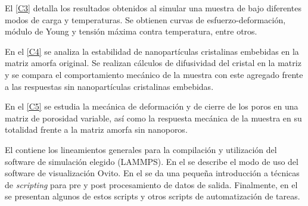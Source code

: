 El \cref{C3} detalla los resultados obtenidos al simular una muestra de \CuZr bajo diferentes modos de carga y temperaturas. Se obtienen curvas de esfuerzo-deformación, módulo de Young y tensión máxima contra temperatura, entre otros.

En el \cref{C4} se analiza la estabilidad de nanopartículas cristalinas embebidas en la matriz amorfa original. Se realizan cálculos de difusividad del cristal en la matriz y se compara el comportamiento mecánico de la muestra con este agregado frente a las respuestas sin nanopartículas cristalinas embebidas.

En el \cref{C5} se estudia la mecánica de deformación y de cierre de los poros en una matriz de porosidad variable, así como la respuesta mecánica de la muestra en su totalidad frente a la matriz amorfa sin nanoporos. 

El  contiene los lineamientos generales para la compilación y utilización del software de simulación elegido (LAMMPS). En el  se describe el modo de uso del software de visualización Ovito. En el  se da una pequeña introducción a técnicas de \textit{scripting} para pre y post procesamiento de datos de salida. Finalmente, en el  se presentan algunos de estos scripts y otros scripts de automatización de tareas.